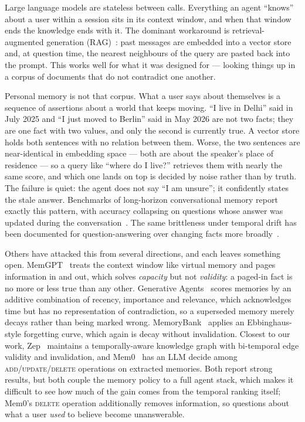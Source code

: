 \documentclass[11pt,a4paper]{article}
\begin{document}
Large language models are stateless between calls. Everything an agent
``knows'' about a user within a session sits in its context window, and when
that window ends the knowledge ends with it. The dominant workaround is
retrieval-augmented generation (RAG)~\cite{lewis2020rag}: past messages are
embedded into a vector store and, at question time, the nearest neighbours of
the query are pasted back into the prompt. This works well for what it was
designed for --- looking things up in a corpus of documents that do not
contradict one another.

Personal memory is not that corpus. What a user says about themselves is a
sequence of assertions about a world that keeps moving. ``I live in Delhi''
said in July 2025 and ``I just moved to Berlin'' said in May 2026 are not two
facts; they are one fact with two values, and only the second is currently
true. A vector store holds both sentences with no relation between them. Worse,
the two sentences are near-identical in embedding space --- both are about the
speaker's place of residence --- so a query like ``where do I live?'' retrieves
them with nearly the same score, and which one lands on top is decided by noise
rather than by truth. The failure is quiet: the agent does not say ``I am
unsure''; it confidently states the stale answer. Benchmarks of long-horizon
conversational memory report exactly this pattern, with accuracy collapsing on
questions whose answer was updated during the conversation~\cite{maharana2024locomo,wu2024longmemeval}.
The same brittleness under temporal drift has been documented for
question-answering over changing facts more broadly~\cite{vu2023freshllms,dhingra2022templama,chen2021timeqa}.

Others have attacked this from several directions, and each leaves something
open. MemGPT~\cite{packer2023memgpt} treats the context window like virtual
memory and pages information in and out, which solves \emph{capacity} but not
\emph{validity}: a paged-in fact is no more or less true than any other.
Generative Agents~\cite{park2023generativeagents} scores memories by an
additive combination of recency, importance and relevance, which acknowledges
time but has no representation of contradiction, so a superseded memory merely
decays rather than being marked wrong. MemoryBank~\cite{zhong2023memorybank}
applies an Ebbinghaus-style forgetting curve, which again is decay without
invalidation. Closest to our work, Zep~\cite{rasmussen2025zep} maintains a
temporally-aware knowledge graph with bi-temporal edge validity and
invalidation, and Mem0~\cite{chhikara2025mem0} has an LLM decide among
\textsc{add}/\textsc{update}/\textsc{delete} operations on extracted memories.
Both report strong results, but both couple the memory policy to a full agent
stack, which makes it difficult to see how much of the gain comes from the
temporal ranking itself; Mem0's \textsc{delete} operation additionally removes
information, so questions about what a user \emph{used} to believe become
unanswerable.
\end{document}
